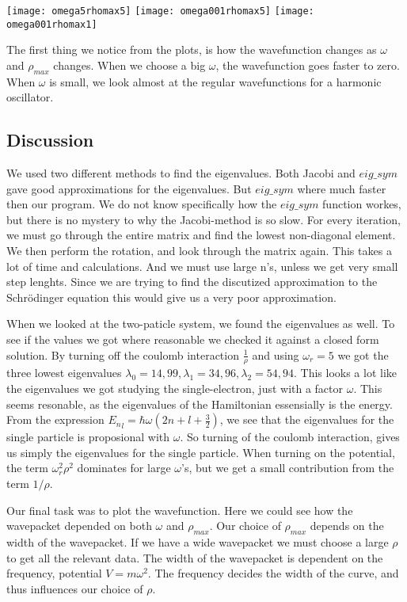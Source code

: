 \documentclass[a4paper,12pt, english]{article}
\begin{document}
\texttt{[image: omega5rhomax5]}
\texttt{[image: omega001rhomax5]}
\texttt{[image: omega001rhomax1]}

The first thing we notice from the plots, is how the wavefunction changes as $\omega$ and $\rho_{max}$ changes. When we choose a big $\omega$, the wavefunction goes faster to zero. When $\omega$ is small, we look almost at the regular wavefunctions for a harmonic oscillator. 

\subsection{Discussion}

We used two different methods to find the eigenvalues. Both Jacobi and $eig\_sym$ gave good approximations for the eigenvalues. But $eig\_sym$ where much faster then our program. We do not know specifically how the $eig\_sym$ function workes, but there is no mystery to why the Jacobi-method is so slow. For every iteration, we must go through the entire matrix and find the lowest non-diagonal element. We then perform the rotation, and look through the matrix again. This takes a lot of time and calculations. 
And we must use large n's, unless we get very small step lenghts. Since we are trying to find the discutized approximation to the Schr\"odinger equation this would give us a very poor approximation.

When we looked at the two-paticle system, we found the eigenvalues as well. 
To see if the values we got where reasonable we checked it against a closed form solution. By turning off the coulomb interaction $\frac{1}{\rho}$ and using $\omega_r = 5$ we got the three lowest eigenvalues $\lambda_0 = 14,99, \lambda_1 = 34,96, \lambda_2 = 54,94$. This looks a lot like the eigenvalues we got studying the single-electron, just with a factor $\omega$. 
This seems resonable, as the eigenvalues of the Hamiltonian essensially is the energy. From the expression ${E_n}_l = \hbar\omega(2n + l + \frac{3}{2})$, we see that the eigenvalues for the single particle is proposional with $\omega$. So turning of the coulomb interaction, gives us simply the eigenvalues for the single particle. 
When turning on the potential, the term $\omega_r^2\rho^2$ dominates for large $\omega$'s, but we get a small contribution from the term $ 1/ \rho$. 

Our final task was to plot the wavefunction. Here we could see how the wavepacket depended on both $\omega$ and $\rho_{max}$. 
Our choice of $\rho_{max}$ depends on the width of the wavepacket. If we have a wide wavepacket we must choose a large $\rho$ to get all the relevant data.   
The width of the wavepacket is dependent on the frequency, potential $V = m \omega ^ 2$. The frequency decides the width of the curve, and thus influences our choice of $\rho$. \\ 
\end{document}
